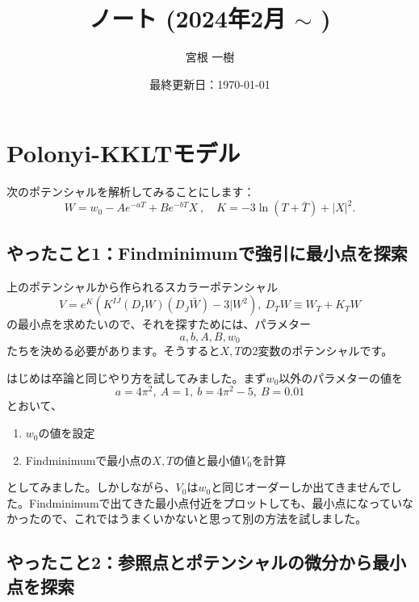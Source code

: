 \documentclass[unicode,a4paper,11pt]{ltjsarticle}
\title{ノート (2024年2月 $\sim$ )}
\author{宮根 一樹}
\date{最終更新日：\today}
\theoremstyle{definition}
\begin{document}
\maketitle

\tableofcontents

\clearpage

\section{Polonyi-KKLTモデル}

次のポテンシャルを解析してみることにします：
\begin{equation}
  W
  =
  w_{0}
  -
  Ae^{-aT}
  +
  Be^{-bT}X
  \ ,\quad
  K
  =
  -3\ln(T+\bar{T})
  +
  |X|^2
  .
\end{equation}



\subsection{やったこと1：Findminimumで強引に最小点を探索}

上のポテンシャルから作られるスカラーポテンシャル
\begin{equation}
  V
  =
  e^{K}
  \left(  
    K^{I\bar{J}}(D_{I}W)(D_{\bar{J}}\bar{W})-3|W^2
  \right)
  ,\ 
  D_{T}W
  \equiv
  W_{T}
  +
  K_{T}W
\end{equation}
の最小点を求めたいので、それを探すためには、パラメター
\begin{equation}
  a,b,A,B,w_{0}
\end{equation}
たちを決める必要があります。そうすると$X,T$の2変数のポテンシャルです。

はじめは卒論と同じやり方を試してみました。まず$w_{0}$以外のパラメターの値を
\begin{equation}
  a=4\pi^2
  ,\ 
  A=1
  ,\ 
  b=4\pi^2-5
  ,\ 
  B=
  0.01
\end{equation}
とおいて、
\begin{enumerate}
  \item 
  $w_{0}$の値を設定
  \item 
  Findminimumで最小点の$X,T$の値と最小値$V_{0}$を計算
\end{enumerate}
としてみました。しかしながら、$V_{0}$は$w_{0}$と同じオーダーしか出てきませんでした。Findminimumで出てきた最小点付近をプロットしても、最小点になっていなかったので、これではうまくいかないと思って別の方法を試しました。



\subsection{やったこと2：参照点とポテンシャルの微分から最小点を探索}
\end{document}
